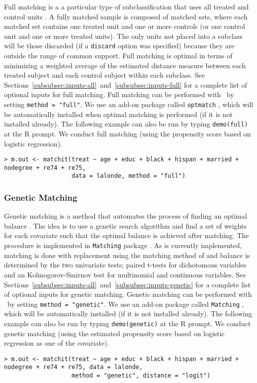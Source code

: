 Full matching is a a particular type of subclassification that uses
all treated and control units \citep{Rosenbaum02, Hansen04}.  A fully
matched sample is composed of matched sets, where each matched set
contains one treated unit and one or more controls (or one control
unit and one or more treated units).  The only units not placed into a
subclass will be those discarded (if a \texttt{discard} option was
specified) because they are outside the range of common support.  Full
matching is optimal in terms of minimizing a weighted average of the
estimated distance measure between each treated subject and each
control subject within each subclass.  See
Sections~\ref{subsubsec:inputs-all}~and~\ref{subsubsec:inputs-full}
for a complete list of optional inputs for full matching.  Full
matching can be performed with \MatchIt\ by setting \texttt{method =
  "full"}.  We use an add-on package called \texttt{optmatch}
\citep{Hansen04}, which will be automatically installed when optimal
matching is performed (if it is not installed already).  The following
example can also be run by typing {\tt demo(full)} at the R prompt.
We conduct full matching (using the propensity score based on logistic
regression).
\begin{verbatim}
> m.out <- matchit(treat ~ age + educ + black + hispan + married + nodegree + re74 + re75, 
                   data = lalonde, method = "full")
\end{verbatim}

\subsubsection{Genetic Matching}
\label{subsub:genetic}

Genetic matching is a method that automates the process of finding an
optimal balance \citep{DiaSek05}. The idea is to use a genetic search
algorithm and find a set of weights for each covariate such that the
optimal balance is achieved after matching. The procedure is
implemented in {\tt Matching} package \citep{Sekhon04}. As is
currently implemented, matching is done with replacement using the
matching method of \citet{AbaImb04} and balance is determined by the
two univariate tests; paired t-tests for dichotomous variables and an
Kolmogorov-Smirnov test for multinomial and continuous variables.  See
Sections~\ref{subsubsec:inputs-all}~and~\ref{subsubsec:inputs-genetic}
for a complete list of optional inputs for genetic matching.  Genetic
matching can be performed with \MatchIt\ by setting \texttt{method =
  "genetic"}.  We use an add-on package called \texttt{Matching}
\citep{Sekhon04}, which will be automatically installed (if it is not
installed already). The following example can also be run by typing
{\tt demo(genetic)} at the R prompt.  We conduct genetic matching
(using the estimated propensity score based on logistic regression as
one of the covariate).
\begin{verbatim}
> m.out <- matchit(treat ~ age + educ + black + hispan + married + nodegree + re74 + re75, data = lalonde, 
                   method = "genetic", distance = "logit")
\end{verbatim}


